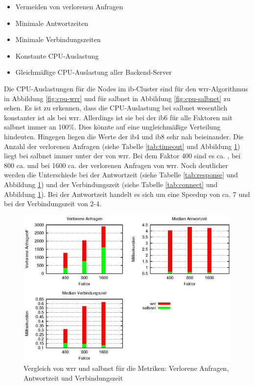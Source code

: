 \documentclass[a4paper, 12pt, BCOR10mm, DIV12, toc=bibliography, toc=listof, german]{scrbook}
\begin{document}
			\begin{itemize}
				\item Vermeiden von verlorenen Anfragen
				\item Minimale Antwortzeiten
				\item Minimale Verbindungszeiten
				\item Konstante CPU-Auslastung
				\item Gleichmäßige CPU-Auslastung aller Backend-Server
			\end{itemize}

			Die CPU-Auslastungen für die Nodes im ib-Cluster sind für den wrr-Algorithmus in Abbildung
			\ref{fig:cpu-wrr} und für salbnet in Abbildung \ref{fig:cpu-salbnet} zu sehen. Es ist zu
			erkennen, dass die CPU-Auslastung bei salbnet wesentlich konstanter ist als bei wrr.
			Allerdings ist sie bei der ib6 für alle Faktoren mit salbnet immer an 100\%. Dies könnte auf
			eine ungleichmäßige Verteilung hindeuten. Hingegen liegen die Werte der ib4 und ib8 sehr nah
			beieinander. Die Anzahl der verlorenen Anfragen (siehe Tabelle \ref{tab:timeout} und Abbildung
			\ref{fig:ergebnis}) liegt bei salbnet immer unter der von wrr. Bei dem Faktor 400 sind es ca.
			, bei 800 ca.  und bei 1600 ca.  der verlorenen
			Anfragen von wrr. Noch deutlicher werden die Unterschiede bei der Antwortzeit (siehe Tabelle
			\ref{tab:response} und Abbildung \ref{fig:ergebnis}) und der Verbindungszeit  (siehe Tabelle
			\ref{tab:connect} und Abbildung \ref{fig:ergebnis}). Bei der Antwortzeit handelt es sich um
			eine Speedup von ca. 7 und bei der Verbindungszeit von 2-4.

			\begin{figure}
				\centering
				\includegraphics[width=13cm]{plots/servload}
				\caption{Vergleich von wrr und salbnet für die Metriken: Verlorene Anfragen, Antwortzeit und	Verbindungszeit}
				\label{fig:ergebnis}
			\end{figure}
\end{document}
